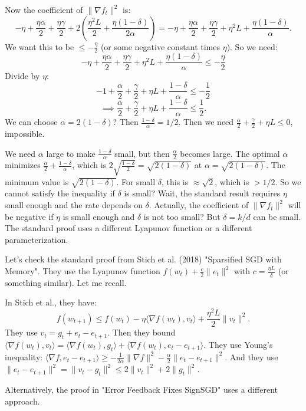 \documentclass{article}
\begin{document}
Now the coefficient of $\|\nabla f_t\|^2$ is:
\[
-\eta + \frac{\eta \alpha}{2} + \frac{\eta \gamma}{2} + 2\left( \frac{\eta^2 L}{2} + \frac{\eta(1-\delta)}{2\alpha} \right)
= -\eta + \frac{\eta \alpha}{2} + \frac{\eta \gamma}{2} + \eta^2 L + \frac{\eta(1-\delta)}{\alpha}.
\]
We want this to be $\le -\frac{\eta}{2}$ (or some negative constant times $\eta$). So we need:
\[
-\eta + \frac{\eta \alpha}{2} + \frac{\eta \gamma}{2} + \eta^2 L + \frac{\eta(1-\delta)}{\alpha} \le -\frac{\eta}{2}
\]
Divide by $\eta$:
\[
-1 + \frac{\alpha}{2} + \frac{\gamma}{2} + \eta L + \frac{1-\delta}{\alpha} \le -\frac{1}{2}
\]
\[
\implies \frac{\alpha}{2} + \frac{\gamma}{2} + \eta L + \frac{1-\delta}{\alpha} \le \frac{1}{2}.
\]
We can choose $\alpha = 2(1-\delta)$? Then $\frac{1-\delta}{\alpha} = 1/2$. Then we need $\frac{\alpha}{2} + \frac{\gamma}{2} + \eta L \le 0$, impossible.

We need $\alpha$ large to make $\frac{1-\delta}{\alpha}$ small, but then $\frac{\alpha}{2}$ becomes large. The optimal $\alpha$ minimizes $\frac{\alpha}{2} + \frac{1-\delta}{\alpha}$, which is $2\sqrt{\frac{1-\delta}{2}} = \sqrt{2(1-\delta)}$ at $\alpha = \sqrt{2(1-\delta)}$. The minimum value is $\sqrt{2(1-\delta)}$. For small $\delta$, this is $\approx \sqrt{2}$, which is $> 1/2$. So we cannot satisfy the inequality if $\delta$ is small? Wait, the standard result requires $\eta$ small enough and the rate depends on $\delta$. Actually, the coefficient of $\|\nabla f_t\|^2$ will be negative if $\eta$ is small enough and $\delta$ is not too small? But $\delta = k/d$ can be small. The standard proof uses a different Lyapunov function or a different parameterization.

Let's check the standard proof from Stich et al. (2018) "Sparsified SGD with Memory". They use the Lyapunov function $f(w_t) + \frac{c}{2}\|e_t\|^2$ with $c = \frac{\eta L}{\delta}$ (or something similar). Let me recall.

In Stich et al., they have:
\[
f(w_{t+1}) \le f(w_t) - \eta \langle \nabla f(w_t), v_t \rangle + \frac{\eta^2 L}{2} \|v_t\|^2.
\]
They use $v_t = g_t + e_t - e_{t+1}$. Then they bound $\langle \nabla f(w_t), v_t \rangle = \langle \nabla f(w_t), g_t \rangle + \langle \nabla f(w_t), e_t - e_{t+1} \rangle$.
They use Young's inequality: $\langle \nabla f, e_t - e_{t+1} \rangle \ge -\frac{1}{2\alpha}\|\nabla f\|^2 - \frac{\alpha}{2}\|e_t - e_{t+1}\|^2$.
And they use $\|e_t - e_{t+1}\|^2 = \|v_t - g_t\|^2 \le 2\|v_t\|^2 + 2\|g_t\|^2$.

Alternatively, the proof in "Error Feedback Fixes SignSGD" uses a different approach.
\end{document}

